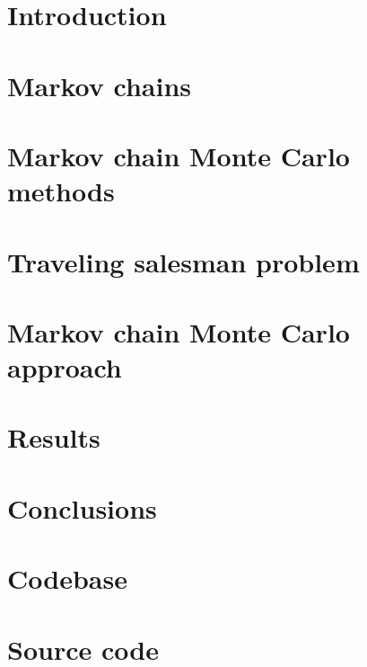 




	
	\newpage
	
	
	\newpage
	
	\tableofcontents
	\listoftables
	\listoffigures
	\clearpage
	
	\section{Introduction}
		
	
	\section{Markov chains}
		
	
	\section{Markov chain Monte Carlo methods}
		
	
	\section{Traveling salesman problem}
		
	
	\section{Markov chain Monte Carlo approach}
	
	\section{Results}
	
	\section{Conclusions}
	
	\section{Codebase}
	
	\clearpage
	\nocite{*}
	
	
	
	
	
	\appendix
	\clearpage
	\section{Source code} \label{apsec:code}
	\clearpage
	
	
